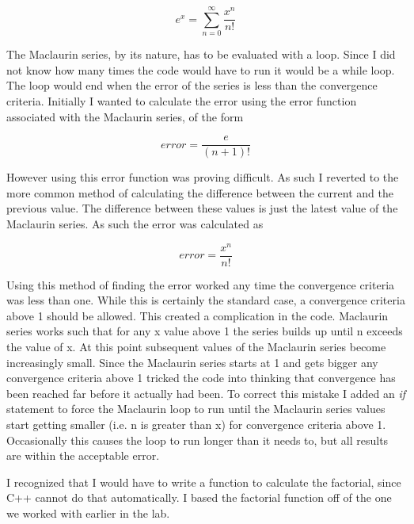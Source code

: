 \documentclass{article}
\begin{document}
\begin{equation}
    e^x = \sum_{n = 0}^{\infty} \frac{x^n}{n!}
\end{equation}

The Maclaurin series, by its nature, has to be evaluated with a loop. Since I did not know how many times the code would have to run it would be a while loop. The loop would end when the error of the series is less than the convergence criteria. Initially I wanted to calculate the error using the error function associated with the Maclaurin series, of the form

\begin{equation}
    error = \frac{e}{(n+1)!}
\end{equation}

However using this error function was proving difficult. As such I reverted to the more common method of calculating the difference between the current and the previous value. The difference between these values is just the latest value of the Maclaurin series. As such the error was calculated as

\begin{equation}
    error = \frac{x^n}{n!}
\end{equation}

Using this method of finding the error worked any time the convergence criteria was less than one. While this is certainly the standard case, a convergence criteria above 1 should be allowed. This created a complication in the code. Maclaurin series works such that for any x value above 1 the series builds up until n exceeds the value of x. At this point subsequent values of the Maclaurin series become increasingly small. Since the Maclaurin series starts at 1 and gets bigger any convergence criteria above 1 tricked the code into thinking that convergence has been reached far before it actually had been. To correct this mistake I added an \textit{if} statement to force the Maclaurin loop to run until the Maclaurin series values start getting smaller (i.e. n is greater than x) for convergence criteria above 1. Occasionally this causes the loop to run longer than it needs to, but all results are within the acceptable error.

I recognized that I would have to write a function to calculate the factorial, since C++ cannot do that automatically. I based the factorial function off of the one we worked with earlier in the lab.
\end{document}
